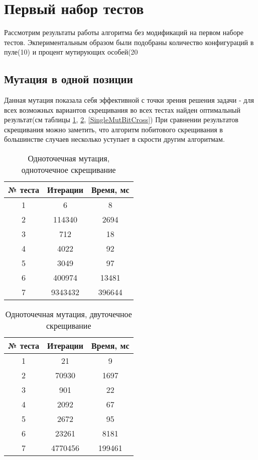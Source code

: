 \section{Первый набор тестов}
Рассмотрим результаты работы алгоритма без модификаций на первом наборе тестов. Экпериментальным образом были подобраны количество конфигураций в пуле(10) и процент мутирующих особей(20%
\subsection{Мутация в одной позиции}
Данная мутация показала себя эффективной с точки зрения решения задачи - для всех возможных вариантов скрещивания во всех тестах найден оптимальный результат(см таблицы \ref{SingleMutSingleCross}, \ref{SingleMutDoubleCross}, \ref{SingleMutBitCross})
При сравнении результатов скрещивания можно заметить, что алгоритм побитового скрещивания в большинстве случаев несколько уступает в скрости другим алгоритмам.
\begin{table}[ht]
\centering
\caption{Одноточечная мутация, одноточечное скрещивание}
\label{SingleMutSingleCross}
\begin{tabular}{|c|c|c|}
\hline
№ теста             & Итерации            & Время, мс            \\ \hline
1                   & 6                   & 8                    \\ \hline
2                   & 114340              & 2694                 \\ \hline
3                   & 712                 & 18                   \\ \hline
4                   & 4022                & 92                   \\ \hline
5                   & 3049                & 97                   \\ \hline
6                   & 400974              & 13481                \\ \hline
7                   & 9343432             & 396644               \\ \hline
\end{tabular}
\end{table}

\begin{table}[ht]
\centering
\caption{Одноточечная мутация, двуточечное скрещивание}
\label{SingleMutDoubleCross}
\begin{tabular}{|c|c|c|}
\hline
№ теста & Итерации & Время, мс \\ \hline
1       & 21       & 9         \\ \hline
2       & 70930    & 1697      \\ \hline
3       & 901      & 22        \\ \hline
4       & 2092     & 67        \\ \hline
5       & 2672     & 95        \\ \hline
6       & 23261    & 8181      \\ \hline
7       & 4770456  & 199461    \\ \hline
\end{tabular}
\end{table}

